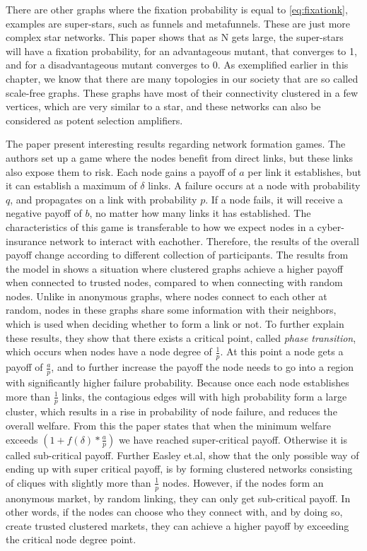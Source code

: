 There are other graphs where the fixation probability is equal to \ref{eq:fixationk}, examples are super-stars, such as funnels and
metafunnels. These are just more complex star networks. This paper shows that as N gets large, the super-stars will have a fixation probability, for an advantageous mutant, that converges to 1, and for a disadvantageous mutant converges to 0. 
As exemplified earlier in this chapter, we know that there are many
topologies in our society that are so called scale-free graphs. These graphs have most of their connectivity clustered in a few vertices, which are very similar to a star, and these networks can also be considered as potent selection amplifiers. 


The paper \cite{contagion} present interesting results regarding network formation games. 
The authors set up a game where the nodes benefit from direct links, but these links also expose them to risk. 
Each node gains a payoff of $a$ per link it establishes, but it can establish a maximum of $\delta$ links.
A failure occurs at a node with probability $q$, and propagates on a link with probability $p$. If a node fails, it will receive a negative payoff of $b$, no matter how many links it has established. The characteristics of this game is transferable to how we expect nodes in a cyber-insurance network to interact with eachother. Therefore, the results of the overall payoff change according to different collection of participants. 
The results from the model in \cite{lieberman2005evolutionary} shows a situation where clustered graphs achieve a higher payoff when connected to trusted nodes, compared to when connecting with random nodes. Unlike in anonymous graphs, where nodes connect to each other at random, nodes in these graphs share some information with their neighbors, which is used when deciding whether to form a link or not. 
To further explain these results, they show that there exists a critical point, called \textit{phase transition}, which occurs when nodes have a node degree of $\frac{1}{p}$. 
At this point a node gets a payoff of $\frac{a}{p}$, and to further increase the payoff the node needs to go into a region with significantly higher failure probability. 
Because once each node establishes more than $\frac{1}{p}$ links, the contagious edges will with high probability form a large cluster, which results in a rise in probability of node failure, and reduces the overall welfare.
From this the paper states that when the minimum welfare exceeds 
$(1+f(\delta)*\frac{a}{p})$
we have reached super-critical payoff. Otherwise it is called sub-critical payoff. 
Further Easley et.al, show that the only possible way of ending up with super critical payoff, is by forming clustered networks consisting of cliques with slightly more than $\frac{1}{p}$ nodes. 
However, if the nodes form an anonymous market, by random linking, they can only get sub-critical payoff. 
In other words, if the nodes can choose who they connect with, and by doing so, create trusted clustered markets, they can achieve a higher payoff by exceeding the critical node degree point. 


